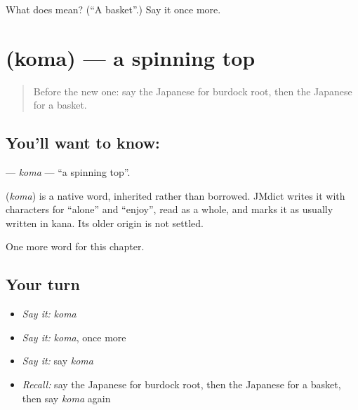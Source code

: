 \begin{tcolorbox}[breakable,colback=teal!4,colframe=teal!35!black,title={Before you move on}]
What does  mean? (\textquotedblleft{}A basket\textquotedblright{}.) Say it once more.
\end{tcolorbox}
\section[\texorpdfstring{\ja{こま} (koma)}{こま (koma)}]{ (koma) — a spinning top}

\label{lesson:JA-C66-koma}



\begin{quote}
Before the new one: say the Japanese for burdock root, then the Japanese for a basket.
\end{quote}

\subsection*{You'll want to know: }
\textbf{} — \emph{koma} — \textquotedblleft{}a spinning top\textquotedblright{}.

\begin{cousinweb}
\textbf{} (\emph{koma}) is a native word, inherited rather than borrowed. JMdict writes it with characters for \textquotedblleft{}alone\textquotedblright{} and \textquotedblleft{}enjoy\textquotedblright{}, read as a whole, and marks it as usually written in kana. Its older origin is not settled.
\end{cousinweb}

\begin{grammarlens}[title={What you've built}]
One more word for this chapter.
\end{grammarlens}

\subsection*{Your turn}
\begin{itemize}
\raggedright
  \item \emph{Say it:} \emph{koma}
  \item \emph{Say it:} \emph{koma}, once more
  \item \emph{Say it:} say \emph{koma}
  \item \emph{Recall:} say the Japanese for burdock root, then the Japanese for a basket, then say \emph{koma} again
\end{itemize}

